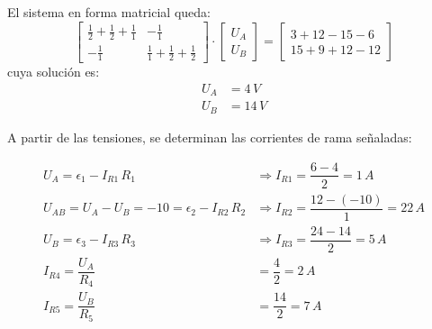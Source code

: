 \begin{example}
          El sistema en forma matricial queda:
          \begin{equation*}
            \begin{bmatrix}
              \frac{1}{2}+\frac{1}{2}+\frac{1}{1} & -\frac{1}{1}\\
              -\frac{1}{1} & \frac{1}{1}+\frac{1}{2}+\frac{1}{2}
            \end{bmatrix}
            \cdot
            \begin{bmatrix}
              U_A\\
              U_B
            \end{bmatrix}
            =
            \begin{bmatrix}
              3+12-15-6\\
              15+9+12-12
            \end{bmatrix}
          \end{equation*}
          cuya solución es:
          \begin{align*}
            U_A&=4\,V\\
            U_B&=14\,V
          \end{align*}

          A partir de las tensiones, se determinan las corrientes de
          rama señaladas:


\begin{align*}
  U_A=\epsilon_1-I_{R1}\,R_1&\Rightarrow {I_{R1}=\dfrac{6-4}{2}=1\,A}\\
  U_{AB}=U_A-U_B=-10=\epsilon_2 - I_{R2}\, R_2&\Rightarrow I_{R2} = \dfrac{12-(-10)}{1}=22\,A\\
  U_B=\epsilon_3-I_{R3}\,R_3 &\Rightarrow I_{R3}=\dfrac{24-14}{2}=5\,A\\
  I_{R4}=\dfrac{U_A}{R_4}&=\dfrac{4}{2}=2\,A\\
  I_{R5}=\dfrac{U_B}{R_5}&=\dfrac{14}{2}=7\,A
\end{align*}


\end{example}
